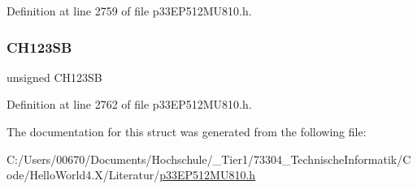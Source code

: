 Definition at line 2759 of file p33\+E\+P512\+M\+U810.\+h.

\mbox{\label{structtag_a_d2_c_h_s123_b_i_t_s_a43fe4bf282da0b96630808288b9dfdd6}} 
\subsubsection{\texorpdfstring{C\+H123\+SB}{CH123SB}}
{\footnotesize\ttfamily unsigned C\+H123\+SB}



Definition at line 2762 of file p33\+E\+P512\+M\+U810.\+h.



The documentation for this struct was generated from the following file\+:\begin{DoxyCompactItemize}
\item 
C\+:/\+Users/00670/\+Documents/\+Hochschule/\+\_\+\+Tier1/73304\+\_\+\+Technische\+Informatik/\+Code/\+Hello\+World4.\+X/\+Literatur/\hyperlink{p33_e_p512_m_u810_8h}{p33\+E\+P512\+M\+U810.\+h}\end{DoxyCompactItemize}
